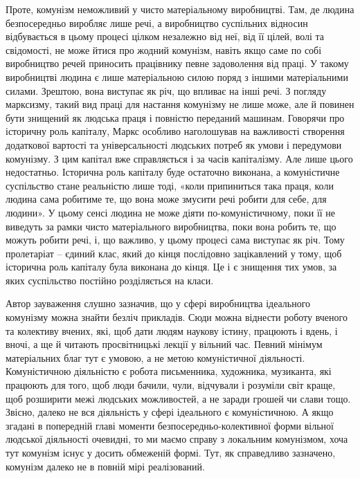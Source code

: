 \documentclass[12pt,a4paper,openany]{book}
\begin{document}
Проте, комунізм неможливий у чисто матеріальному виробництві. Там, де людина безпосередньо виробляє лише речі, а виробництво суспільних відносин відбувається в цьому процесі цілком незалежно від неї, від її цілей, волі та свідомості, не може йтися про жодний комунізм, навіть якщо саме по собі виробництво речей приносить працівнику певне задоволення від праці. У такому виробництві людина є лише матеріальною силою поряд з іншими матеріальними силами. Зрештою, вона виступає як річ, що впливає на інші речі. З погляду марксизму, такий вид праці для настання комунізму не лише може, але й повинен бути знищений як людська праця і повністю переданий машинам. Говорячи про історичну роль капіталу, Маркс особливо наголошував на важливості створення додаткової вартості та універсальності людських потреб як умови і передумови комунізму. З цим капітал вже справляється і за часів капіталізму. Але лише цього недостатньо. Історична роль капіталу буде остаточно виконана, а комуністичне суспільство стане реальністю лише тоді, «коли припиниться така праця, коли людина сама робитиме те, що вона може змусити речі робити для себе, для людини». У цьому сенсі людина не може діяти по-комуністичному, поки її не виведуть за рамки чисто матеріального виробництва, поки вона робить те, що можуть робити речі, і, що важливо, у цьому процесі сама виступає як річ. Тому пролетаріат – єдиний клас, який до кінця послідовно зацікавлений у тому, щоб історична роль капіталу була виконана до кінця. Це і є знищення тих умов, за яких суспільство постійно розділяється на класи.

Автор зауваження слушно зазначив, що у сфері виробництва ідеального комунізму можна знайти безліч прикладів. Сюди можна віднести роботу вченого та колективу вчених, які, щоб дати людям наукову істину, працюють і вдень, і вночі, а ще й читають просвітницькі лекції у вільний час. Певний мінімум матеріальних благ тут є умовою, а не метою комуністичної діяльності. Комуністичною діяльністю є робота письменника, художника, музиканта, які працюють для того, щоб люди бачили, чули, відчували і розуміли світ краще, щоб розширити межі людських можливостей, а не заради грошей чи слави тощо. Звісно, далеко не вся діяльність у сфері ідеального є комуністичною. А якщо згадані в попередній главі моменти безпосередньо-колективної форми вільної людської діяльності очевидні, то ми маємо справу з локальним комунізмом, хоча тут комунізм існує у досить обмеженій формі. Тут, як справедливо зазначено, комунізм далеко не в повній мірі реалізований.
\end{document}
